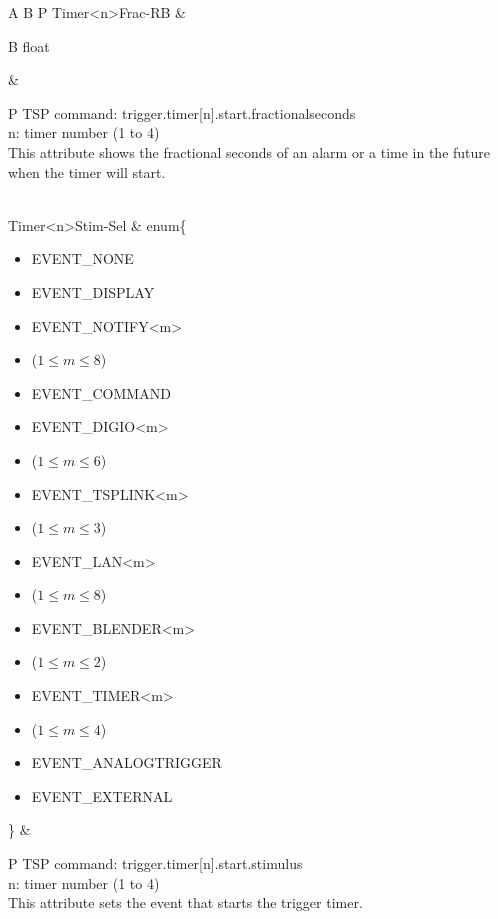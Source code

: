 \documentclass[openany]{article}
\begin{document}
\begin{longtable}{A B P}
		Timer{\textless n\textgreater}Frac-RB & \begin{tabular}{B}
					float
				\end{tabular} & 
				\begin{tabular}{P}
					TSP command: trigger.timer[n].start.fractionalseconds \\
					n: timer number (1 to 4) \\
					This attribute shows the fractional seconds of an alarm or a time in the future when the timer will start.
				\end{tabular} \\ \hline
		Timer{\textless n\textgreater}Stim-Sel & enum\{\begin{itemize}[noitemsep]
					\small
					\item[] EVENT\_NONE
					\item[] EVENT\_DISPLAY
					\item[] EVENT\_NOTIFY\textless m\textgreater
					\item[] ($1\leq m\leq 8$)
					\item[] EVENT\_COMMAND
					\item[] EVENT\_DIGIO\textless m\textgreater
					\item[] ($1\leq m\leq 6$)
					\item[] EVENT\_TSPLINK\textless m\textgreater
					\item[] ($1\leq m\leq 3$)
					\item[] EVENT\_LAN\textless m\textgreater
					\item[] ($1\leq m\leq 8$)
					\item[] EVENT\_BLENDER\textless m\textgreater 
					\item[] ($1\leq m\leq 2$)
					\item[] EVENT\_TIMER\textless m\textgreater
					\item[] ($1\leq m\leq 4$)
					\item[] EVENT\_ANALOGTRIGGER
					\item[] EVENT\_EXTERNAL
				\end{itemize}\} & 
				\begin{tabular}{P}
					TSP command: trigger.timer[n].start.stimulus \\
					n: timer number (1 to 4) \\
					This attribute sets the event that starts the trigger timer.
				\end{tabular} \\


\end{longtable}
\end{document}
